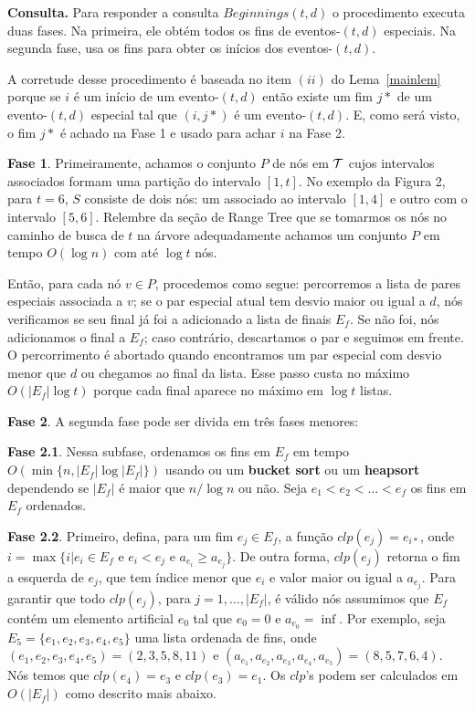 \documentclass[dissertacao, brazil]{ThesisPUC}
\begin{document}
\textbf{Consulta.}
Para responder a consulta $Beginnings(t,d)$ o procedimento executa duas fases. Na primeira, 
ele obtém todos os fins de eventos-$(t,d)$ especiais. Na segunda fase, usa os fins para obter
os inícios dos eventos-$(t,d)$.

A corretude desse procedimento é baseada no item $(ii)$ do Lema~\ref{mainlem} porque se $i$ é um
início de um evento-$(t,d)$ então existe um fim $j*$ de um evento-$(t,d)$ especial tal que $(i, j*)$
é um evento-$(t,d)$. E, como será visto, o fim $j*$ é achado na Fase 1 e usado para achar $i$ na Fase 2.

\textbf{Fase 1}. Primeiramente, achamos o conjunto $P$ de nós em ${\cal T}$ cujos intervalos associados
formam uma partição do intervalo $[1, t]$. No exemplo da Figura 2, para $t = 6$, $S$ consiste de 
dois nós: um associado ao intervalo $[1, 4]$ e outro com o intervalo $[5, 6]$. Relembre da seção
de Range Tree que se tomarmos os nós no caminho de busca de $t$ na árvore adequadamente 
achamos um conjunto $P$ em tempo $O(\log n)$ com até $\log t$ nós.
 
Então, para cada nó $v \in P$,  procedemos como segue: percorremos a lista de pares especiais associada
a $v$; se o par especial atual tem desvio maior ou igual a $d$, nós verificamos se seu final já foi a adicionado a lista de finais $E_f$.
 Se não foi, nós adicionamos o final a $E_f$; caso contrário, descartamos o par e seguimos em frente.
  O percorrimento é abortado quando encontramos um par especial com desvio menor que $d$
ou chegamos ao final da lista. Esse passo custa no máximo $O(|E_f| \log t)$ porque cada final aparece no máximo
em $\log t$ listas.

\textbf{Fase 2}. A segunda fase pode ser divida em três fases menores:

\textbf{Fase 2.1}. Nessa subfase, ordenamos os fins em $E_f$ em tempo $O(\min\{n, |E_f|\log|E_f|\})$  
usando ou um \textbf{bucket sort} ou um \textbf{heapsort} dependendo se $|E_f|$ é maior que $n/\log n$ ou
não. Seja $e_1 < e_2 < \ldots < e_f$ os fins em $E_f$ ordenados.

\textbf{Fase 2.2}. Primeiro, defina, para um fim $e_j \in E_f$, a função $clp(e_j) = e_{i*}$,
onde $i = \max\{i|e_i \in E_f \text{ e } e_i < e_j \text{ e } a_{e_i} \ge a_{e_j}\}$. De outra forma,
$clp(e_j)$ retorna o fim a esquerda de $e_j$, que tem índice menor que $e_i$ e valor maior ou 
igual a $a_{e_j}$. Para garantir que todo $clp(e_j)$, para $j = 1, \ldots, |E_f|$, é válido nós
assumimos que $E_f$ contém um elemento artificial $e_0$ tal que $e_0 = 0$ e $a_{e_0} = \inf$.
Por exemplo, seja $E_5 = \{e_1, e_2, e_3, e_4, e_5\}$ uma lista ordenada de fins, onde 
$(e_1, e_2, e_3, e_4, e_5) = (2,3,5,8, 11)$ e $(a_{e_1}, a_{e_2}, a_{e_3}, a_{e_4}, a_{e_5}) = (8,5,7,6,4)$.
Nós temos que $clp(e_4) = e_3$ e $clp(e_3) = e_1$. Os $clp$'s podem ser calculados em $O(|E_f|)$ como
descrito mais abaixo. 
\end{document}
